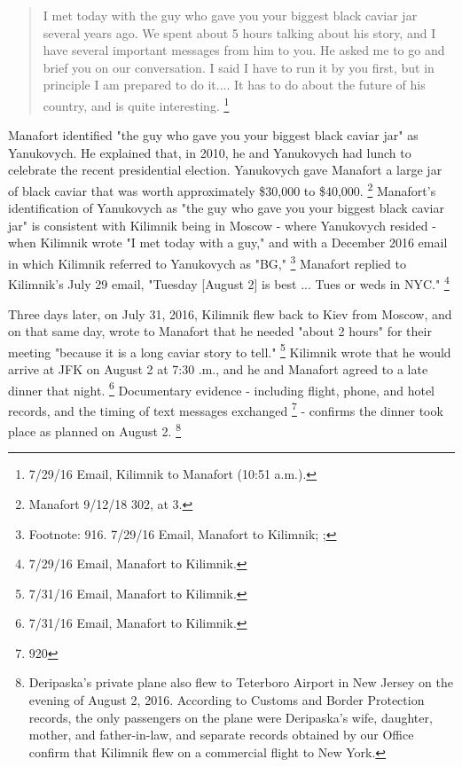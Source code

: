 \begin{quote}
I met today with the guy who gave you your biggest black caviar jar several years ago.
We spent about 5 hours talking about his story, and I have several important messages from him to you.
He asked me to go and brief you on our conversation.
I said I have to run it by you first, but in principle I am prepared to do it....
It has to do about the future of his country, and is quite interesting.%
\footnote{7/29/16 Email, Kilimnik to Manafort (10:51 a.m.).}
\end{quote}

Manafort identified "the guy who gave you your biggest black caviar jar" as Yanukovych.
He explained that, in 2010, he and Yanukovych had lunch to celebrate the recent presidential election.
Yanukovych gave Manafort a large jar of black caviar that was worth approximately \$30,000 to \$40,000.%
\footnote{Manafort 9/12/18 302, at 3.}
Manafort's identification of Yanukovych as "the guy who gave you your biggest black caviar jar" is consistent with Kilimnik being in Moscow - where Yanukovych resided - when Kilimnik wrote "I met today with a guy," and with a December 2016 email in which Kilimnik referred to Yanukovych as "BG,"
\footnote{Footnote: 916. 7/29/16 Email, Manafort to Kilimnik; ; }
Manafort replied to Kilimnik's July 29 email, "Tuesday [August 2] is best ... Tues or weds in NYC."%
\footnote{7/29/16 Email, Manafort to Kilimnik.}

Three days later, on July 31, 2016, Kilimnik flew back to Kiev from Moscow, and on that same day, wrote to Manafort that he needed "about 2 hours" for their meeting "because it is a long caviar story to tell."%
\footnote{7/31/16 Email, Manafort to Kilimnik.}
Kilimnik wrote that he would arrive at JFK on August 2 at 7:30 .m., and he and Manafort agreed to a late dinner that night.%
\footnote{7/31/16 Email, Manafort to Kilimnik.}
Documentary evidence - including flight, phone, and hotel records, and the timing of text messages exchanged%
\footnote{920}
- confirms the dinner took place as planned on August 2.%
\footnote{Deripaska's private plane also flew to Teterboro Airport in New Jersey on the evening of August 2, 2016. According to Customs and Border Protection records, the only passengers on the plane were Deripaska's wife, daughter, mother, and father-in-law, and separate records obtained by our Office confirm that Kilimnik flew on a commercial flight to New York.}

